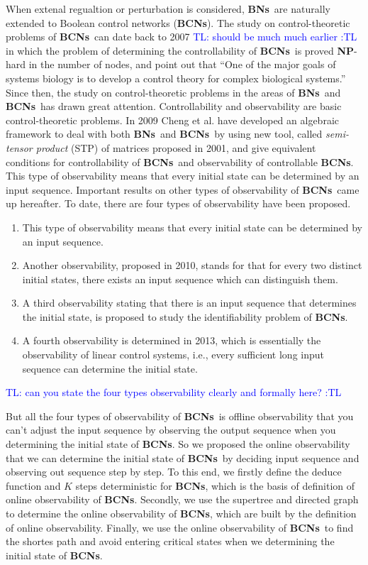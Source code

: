 \documentclass[letterpaper, 10 pt, conference]{ieeeconf}  %
\def \BNs {{\bf BNs}}
\def \BCNs {{\bf BCNs}}
\newcommand{\tl}[1]{\textcolor{blue} {TL: #1 :TL} }
\begin{document}
When extenal regualtion or perturbation is considered, \BNs\ are naturally extended to Boolean control networks ({\bf BCNs}). The study on control-theoretic problems of \BCNs\ can date back to 2007 \tl{should be much much earlier} in which the problem of determining the controllability of \BCNs\ is proved {\bf NP}-hard in the number of nodes, and point out that ``One of the major goals of systems biology is to develop a control theory for complex biological systems.'' Since then, the study on control-theoretic problems in the areas of \BNs\ and \BCNs\ has drawn great attention. Controllability and observability are basic control-theoretic problems. In 2009 Cheng et al. have developed an algebraic framework to deal with both \BNs\ and \BCNs\ by using new tool, called \emph{semi-tensor product} (STP) of matrices proposed in 2001, and give equivalent conditions for controllability of \BCNs\ and observability of controllable {\bf BCNs}. This type of observability means that every initial state can be determined by an input sequence. Important results on other types of observability of \BCNs\ came up hereafter. To date, there are four types of observability have been proposed. 

\begin{enumerate}
	\item This type of observability means that every initial state can be determined by an input sequence.
	
	\item 
	Another observability, proposed in 2010, stands for that for every two distinct initial states, there exists an input sequence which can distinguish them.
	
	\item A third observability stating that there is an input sequence that determines the initial state, is proposed to study the identifiability problem of {\bf BCNs}.
	
	\item  A fourth observability is determined in 2013, which is essentially the observability of linear control systems, i.e., every sufficient long input sequence can determine the initial state.
\end{enumerate}
 

\tl{can you state the four types observability clearly and formally here?}

But all the four types of observability of \BCNs\ is offline observability that you can't adjust the input sequence by observing the output sequence when you determining the initial state of {\bf BCNs}. So we proposed the online observability that we can determine the initial state of \BCNs\ by deciding input sequence and observing out sequence step by step. To this end, we firstly define the deduce function and $K$ steps deterministic for {\bf BCNs}, which is the basis of definition of online observability of {\bf BCNs}. Secondly, we use the supertree and directed graph to determine the online observability of {\bf BCNs}, which are built by the definition of online observability. Finally, we use the online observability of \BCNs\ to find the shortes path and avoid entering critical states when we determining the initial state of {\bf BCNs}. 
\end{document}
